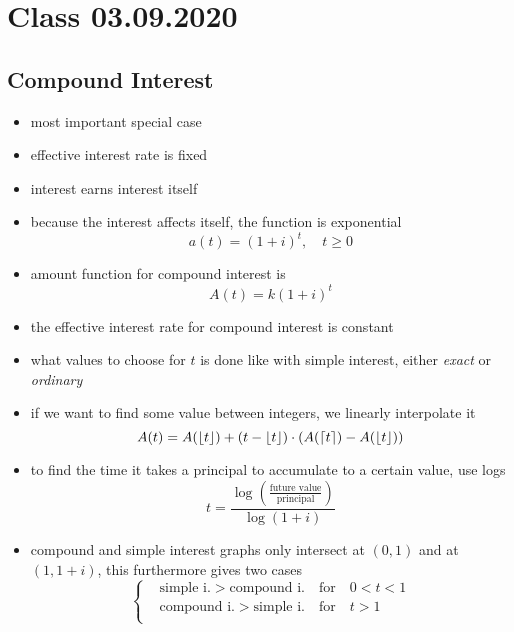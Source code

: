 \documentclass[../00_main.tex]{subfiles}
\begin{document}
\section{Class 03.09.2020}

\subsection{Compound Interest}

\begin{itemize}
    \item most important special case
    \item effective interest rate is fixed
    \item interest earns interest itself
    \item because the interest affects itself, the function is exponential
        \begin{equation}\nonumber
            a(t) = (1+i)^t, \quad t \ge 0
        \end{equation}
    \item amount function for compound interest is
        \begin{equation}\nonumber
            A(t) = k(1+i)^t
        \end{equation}
    \item the effective interest rate for compound interest is constant
    \item what values to choose for $t$ is done like with simple interest,
        either \textit{exact} or \textit{ordinary}
    \item if we want to find some value between integers, we linearly
        interpolate it 
        \begin{equation}\nonumber
            A(t) = A(\floor*{t}) + (t - \floor*{t}) \cdot 
                (A(\ceil*{t})-A(\floor*{t}))
        \end{equation}
    \item to find the time it takes a principal to accumulate to a certain
        value, use logs
        \begin{equation}\nonumber
            t = \frac{\log{(\frac{\text{future value}}{\text{principal}})}}
                {\log{(1+i)}}
        \end{equation}
    \item compound and simple interest graphs only intersect at $(0,1)$ and at
        $(1, 1+i)$, this furthermore gives two cases
        \begin{equation}\nonumber
            \begin{cases}
                &\text{simple i.} > \text{compound i.} \quad \text{for} \quad
                    0 < t < 1 \\
                &\text{compound i.} > \text{simple i.} \quad \text{for} \quad
                    t > 1 \\
            \end{cases}
        \end{equation}
\end{itemize}
\end{document}
